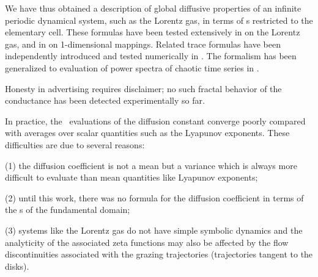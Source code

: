 


We have thus obtained a description of global diffusive properties of an
infinite periodic dynamical system, such as the Lorentz gas, in terms of
\po s restricted to the elementary cell. These formulas have
been tested extensively in  on the Lorentz gas,
and in  on 1-dimensional mappings. Related trace formulas
have been independently introduced and tested numerically in
. The formalism has been generalized to evaluation of
power spectra of chaotic time series in .

Honesty in advertising requires disclaimer; no such fractal behavior of
the conductance has been detected experimentally so far.

In practice, the \po\ evaluations
of the diffusion constant converge poorly compared with averages over scalar
quantities such as the Lyapunov exponents.  These difficulties are due to
several reasons:

(1) the diffusion coefficient is not a mean but a variance which is
always more difficult to evaluate than mean quantities like Lyapunov
exponents;

(2) until this work, there was no formula for the diffusion coefficient in
terms of the \po s of the fundamental domain;

(3) systems like the Lorentz gas do not have simple symbolic dynamics and
the analyticity of the associated zeta functions may also be affected by
the flow discontinuities associated with the grazing trajectories
(trajectories tangent to the disks).
